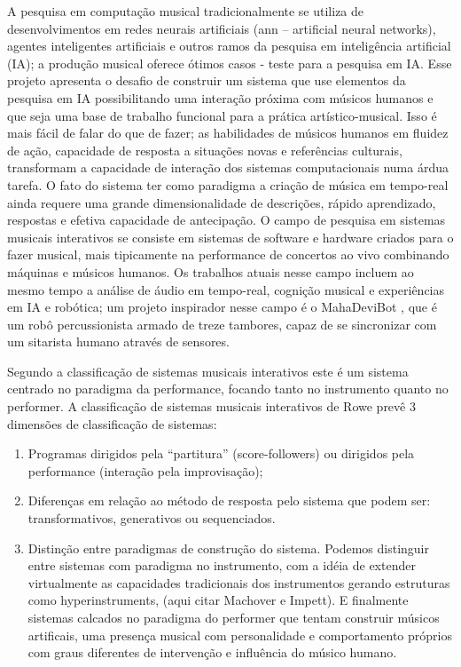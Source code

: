 \documentclass[draft]{ppgmus}
\begin{document}
A pesquisa em computação musical tradicionalmente se utiliza de
desenvolvimentos em redes neurais artificiais (ann – artificial neural
networks), agentes inteligentes artificiais e outros ramos da pesquisa
em inteligência artificial (IA); a produção musical oferece ótimos
casos - teste para a pesquisa em IA. Esse projeto apresenta o desafio
de construir um sistema que use elementos da pesquisa em IA
possibilitando uma interação próxima com músicos humanos e que seja
uma base de trabalho funcional para a prática artístico-musical. Isso
é mais fácil de falar do que de fazer; as habilidades de músicos
humanos em fluidez de ação, capacidade de resposta a situações novas e
referências culturais, transformam a capacidade de interação dos
sistemas computacionais numa árdua tarefa. O fato do sistema ter como
paradigma a criação de música em tempo-real ainda requere uma grande
dimensionalidade de descrições, rápido aprendizado, respostas e
efetiva capacidade de antecipação. O campo de pesquisa em sistemas
musicais interativos \cite{rowe93:interactive} se consiste em sistemas de software e
hardware criados para o fazer musical, mais tipicamente na performance
de concertos ao vivo combinando máquinas e músicos humanos. Os
trabalhos atuais nesse campo incluem ao mesmo tempo a análise de áudio
em tempo-real, cognição musical e experiências em IA e robótica; um
projeto inspirador nesse campo é o MahaDeviBot \cite{kapur07:integrating}, que
é um robô percussionista armado de treze tambores, capaz de se
sincronizar com um sitarista humano através de sensores.

Segundo a classificação de sistemas musicais interativos \cite{rowe93:interactive}
este é um sistema centrado no paradigma da performance, focando tanto
no instrumento quanto no performer. A classificação de sistemas
musicais interativos de Rowe prevê 3 dimensões de classificação de
sistemas:

\begin{enumerate}
\item Programas dirigidos pela ``partitura'' (score-followers) ou
  dirigidos pela performance (interação pela improvisação);
\item Diferenças em relação ao método de resposta pelo sistema que
  podem ser: transformativos, generativos ou sequenciados.
\item Distinção entre paradigmas de construção do sistema. Podemos
  distinguir entre sistemas com paradigma no instrumento, com a idéia
  de extender virtualmente as capacidades tradicionais dos
  instrumentos gerando estruturas como hyperinstruments, (aqui citar
  Machover e Impett). E finalmente sistemas calcados no paradigma do
  performer que tentam construir músicos artificais, uma presença
  musical com personalidade e comportamento próprios com graus
  diferentes de intervenção e influência do músico humano.
\end{enumerate}
\end{document}
